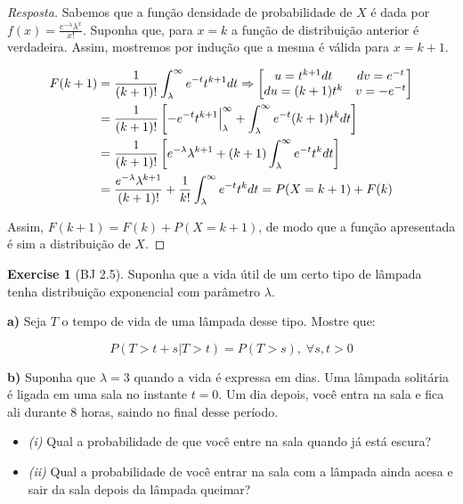 \documentclass[
]{article}
\providecommand{\tightlist}{%
  \setlength{\itemsep}{0pt}\setlength{\parskip}{0pt}}
\theoremstyle{definition}
\theoremstyle{definition}
\theoremstyle{definition}
\newtheorem{exercise}{Exercise}[section]
\theoremstyle{definition}
\theoremstyle{remark}
\begin{document}
\begin{proof}[Resposta]
Sabemos que a função densidade de probabilidade de \(X\) é dada por \(f(x) = \frac{e^{-\lambda}\lambda^{x}}{x!}\). Suponha que, para \(x = k\) a função de distribuição anterior é verdadeira. Assim, mostremos por indução que a mesma é válida para \(x = k+1\).

\begin{align*}
F(k+1) &= \frac{1}{(k+1)!}\int_{\lambda}^{\infty}e^{-t}t^{k+1}dt \Rightarrow \begin{bmatrix}
u = t^{k+1}dt & dv = e^{-t} \\
du = (k+1)t^{k} & v = -e^{-t}
\end{bmatrix}\\
&= \frac{1}{(k+1)!}\left[-e^{-t}t^{k+1}\Big{|}_{\lambda}^{\infty} + \int_{\lambda}^{\infty}e^{-t}(k+1)t^{k}dt\right] \\
&= \frac{1}{(k+1)!}\left[e^{-\lambda}\lambda^{k+1} + (k+1)\int_{\lambda}^{\infty}e^{-t}t^{k}dt\right] \\
&= \frac{e^{-\lambda}\lambda^{k+1}}{(k+1)!} + \frac{1}{k!}\int_{\lambda}^{\infty}e^{-t}t^{k}dt = P(X = k+1) + F(k)
\end{align*}

Assim, \(F(k + 1) = F(k) + P(X = k+1)\), de modo que a função apresentada é sim a distribuição de \(X\).
\end{proof}

\begin{exercise}[BJ 2.5]

Suponha que a vida útil de um certo tipo de lâmpada tenha distribuição exponencial com parâmetro \(\lambda\).

\textbf{a)} Seja \(T\) o tempo de vida de uma lâmpada desse tipo. Mostre que:

\begin{equation*}
P(T > t+s | T>t) = P(T > s), \; \forall s,t>0
\end{equation*}

\textbf{b)} Suponha que \(\lambda = 3\) quando a vida é expressa em dias. Uma lâmpada solitária é ligada em uma sala no instante \(t = 0\). Um dia depois, você entra na sala e fica ali durante 8 horas, saindo no final desse período.

\begin{itemize}
\tightlist
\item
  \emph{(i)} Qual a probabilidade de que você entre na sala quando já está escura?
\item
  \emph{(ii)} Qual a probabilidade de você entrar na sala com a lâmpada ainda acesa e sair da sala depois da lâmpada queimar?
\end{itemize}

\end{exercise}
\end{document}
